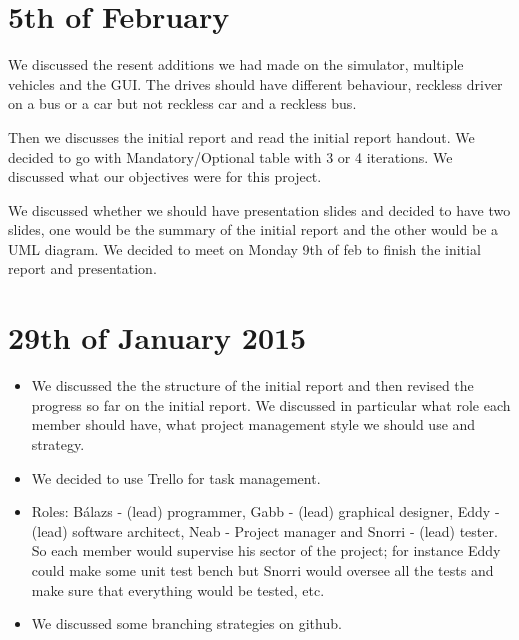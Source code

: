 \documentclass[11pt]{article}
\begin{document}
\section{5th of February}
We discussed the resent additions we had made on the simulator, multiple vehicles and the GUI. The drives should have different behaviour, reckless driver on a bus or a car but not reckless car and a reckless bus.

Then we discusses the initial report and read the initial report handout. We decided to go with Mandatory/Optional table with 3 or 4 iterations. We discussed what our objectives were for this project.

We discussed whether we should have presentation slides and decided to have two slides, one would be the summary of the initial report and the other would be a UML diagram. We decided to meet on Monday 9th of feb to finish the initial report and presentation.

\newpage

\section{29th of January 2015}
\begin{itemize}
\item We discussed the the structure of the initial report and then revised the progress so far on the initial report. We discussed in particular what role each member should have, what project management style we should use and strategy.
\item We decided to use Trello for task management.
\item Roles: Bálazs - (lead) programmer, Gabb - (lead) graphical designer, Eddy - (lead) software architect, Neab - Project manager and Snorri - (lead) tester. So each member would supervise his sector of the project; for instance Eddy could make some unit test bench but Snorri would oversee all the tests and make sure that everything would be tested, etc.
\item We discussed some branching strategies on github. 
\end{itemize} 

\newpage
\end{document}
